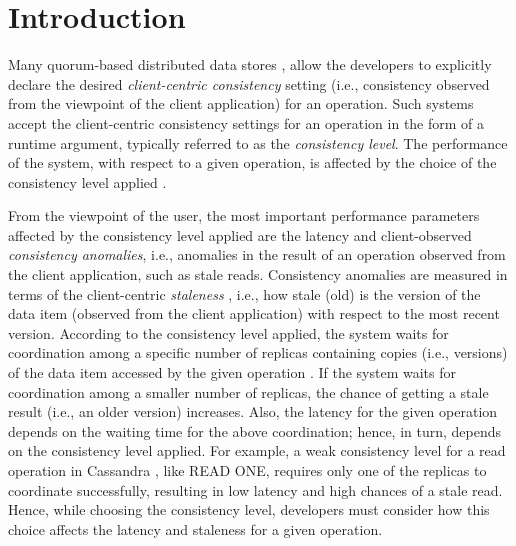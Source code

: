 \documentclass[conference]{IEEEtran}
\begin{document}
\IEEEpeerreviewmaketitle



\section{Introduction}\label{sec:intro}

Many quorum-based distributed  data stores \cite{Lakshman:2010:CDS:1773912.1773922,Meiklejohn:2013:RPD:2505305.2505309,Calder:2011:WAS:2043556.2043571}, allow the developers to explicitly declare the desired \emph{client-centric consistency} setting (i.e., consistency observed from the viewpoint of the client application) for an operation. Such systems  accept the client-centric consistency settings for an operation in the form of a
        runtime argument, typically referred to as the \emph{consistency level}.
    The performance of the system, with respect to a given operation, is affected by the choice of the
   consistency level applied \cite{Terry:2013:CSL:2517349.2522731}. \par From the viewpoint of the user, the most important performance parameters affected by the consistency
   level applied are the latency and client-observed \emph{consistency
anomalies}, i.e., anomalies in the result of an operation observed from the client application, such as stale reads.
Consistency anomalies are measured in terms of the  client-centric \emph{staleness}
  \cite{bayou}, i.e., how stale (old) is the version of
 the data item (observed from the client application) with respect to the most recent version.
According to the consistency level applied, the system waits for coordination
     among a specific number of replicas containing copies (i.e., versions) of the data item accessed by the given operation \cite{Lakshman:2010:CDS:1773912.1773922}. If the
     system waits for coordination among a smaller number of replicas, the chance of getting a stale result (i.e., an older version) increases.  Also, the latency for
      the given operation depends on the waiting time for the above coordination; hence, in turn, depends on the
       consistency level applied.  For example, a
   weak consistency level for a read operation in Cassandra \cite{Lakshman:2010:CDS:1773912.1773922}, like READ ONE, requires only one of the replicas
   to coordinate successfully, resulting in low latency and high chances of a stale read. Hence, while choosing the consistency level, developers must consider how this choice
  affects the latency and staleness for a given operation.
  \par
\end{document}
